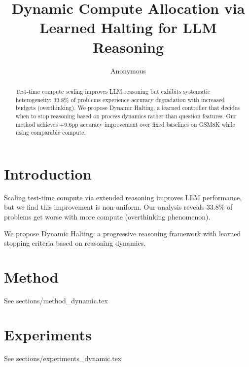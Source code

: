 \documentclass{article}
\title{Dynamic Compute Allocation via Learned Halting for LLM Reasoning}
\author{Anonymous}
\begin{document}
\maketitle

\begin{abstract}
Test-time compute scaling improves LLM reasoning but exhibits systematic heterogeneity: 33.8\% of problems experience accuracy degradation with increased budgets (overthinking).
We propose Dynamic Halting, a learned controller that decides when to stop reasoning based on process dynamics rather than question features.
Our method achieves +9.6pp accuracy improvement over fixed baselines on GSM8K while using comparable compute.
\end{abstract}

\section{Introduction}
Scaling test-time compute via extended reasoning improves LLM performance, but we find this improvement is non-uniform.
Our analysis reveals 33.8\% of problems get worse with more compute (overthinking phenomenon).

We propose Dynamic Halting: a progressive reasoning framework with learned stopping criteria based on reasoning dynamics.

\section{Method}
See sections/method_dynamic.tex

\section{Experiments}
See sections/experiments_dynamic.tex
\end{document}
